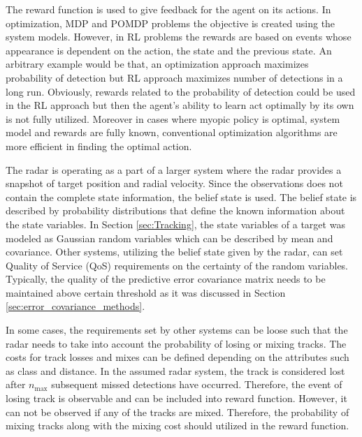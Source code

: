 \documentclass[english, 12pt, a4paper, elec, utf8, a-1b, online]{aaltothesis}
\newcommand{\nmax}{n_\text{max}}
\begin{document}
The reward function is used to give feedback for the agent on its actions.
In optimization, MDP and POMDP problems the objective is created using the system models.
However, in RL problems the rewards are based on events whose appearance is dependent on the action, the state and the previous state. 
An arbitrary example would be that, an optimization approach maximizes probability of detection but RL approach maximizes number of detections in a long run.
Obviously, rewards related to the probability of detection could be used in the RL approach but then the agent's ability to learn act optimally by its own is not fully utilized.
Moreover in cases where myopic policy is optimal, system model and rewards are fully known, conventional optimization algorithms are more efficient in finding the optimal action.

The radar is operating as a part of a larger system where the radar provides a snapshot of target position and radial velocity.
Since the observations does not contain the complete state information, the belief state is used.
The belief state is described by probability distributions that define the known information about the state variables.
In Section \ref{sec:Tracking}, the state variables of a target was modeled as Gaussian random variables which can be described by mean and covariance.
Other systems, utilizing the belief state given by the radar, can set Quality of Service (QoS) requirements on the certainty of the random variables.
Typically, the quality of the predictive error covariance matrix needs to be maintained above certain threshold as it was discussed in Section \ref{sec:error_covariance_methods}.

In some cases, the requirements set by other systems can be loose such that the radar needs to take into account the probability of losing or mixing tracks.
The costs for track losses and mixes can be defined depending on the attributes such as class and distance.
In the assumed radar system, the track is considered lost after $\nmax$ subsequent missed detections have occurred.
Therefore, the event of losing track is observable and can be included into reward function.
However, it can not be observed if any of the tracks are mixed.
Therefore, the probability of mixing tracks along with the mixing cost should utilized in the reward function.
\end{document}
